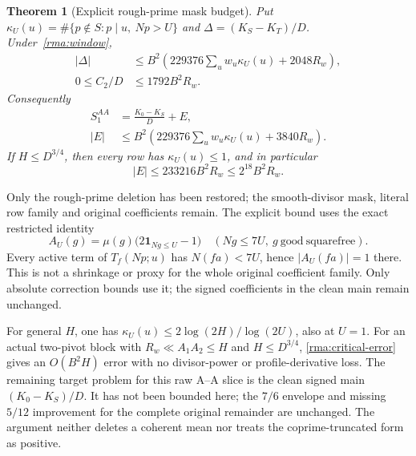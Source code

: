 \documentclass[11pt]{article}
\newtheorem{theorem}{Theorem}[section]
\theoremstyle{definition}\newtheorem{definition}[theorem]{Definition}
\theoremstyle{remark}\newtheorem{remark}[theorem]{Remark}
\begin{document}
\begin{theorem}[Explicit rough-prime mask budget]\label{rma:mask}
Put $\kappa_U(u)=\#\{p\notin S:p\mid u,\ Np>U\}$ and
$\Delta=(K_S-K_T)/D$. Under~\eqref{rma:window},
\begin{align}
 |\Delta|&\le B^2\left(229376\sum_u w_u\kappa_U(u)+2048R_w\right),
                    \label{rma:delta}\\
 0\le C_2/D&\le1792B^2R_w.\label{rma:Cbound}
\end{align}
Consequently
\begin{align}
 S_1^{AA}&=\frac{K_0-K_S}{D}+E,\label{rma:clean}\\
 |E|&\le B^2\left(229376\sum_u w_u\kappa_U(u)+3840R_w\right).
                    \label{rma:error}
\end{align}
If $H\le D^{3/4}$, then every row has $\kappa_U(u)\le1$, and in particular
\begin{equation}\label{rma:critical-error}
 |E|\le233216B^2R_w\le2^{18}B^2R_w.
\end{equation}
\end{theorem}
Only the rough-prime deletion has been restored; the smooth-divisor
mask, literal row family and original coefficients remain. The explicit
bound uses the exact restricted identity
\[
 A_U(g)=\mu(g)\bigl(2\mathbf1_{Ng\le U}-1\bigr)
 \quad(Ng\le7U,\ g\ \mathrm{good\ squarefree}).
\]
Every active term of $T_f(Np;u)$ has $N(fa)<7U$, hence
$|A_U(fa)|=1$ there. This is not a shrinkage or proxy for the whole
original coefficient family. Only absolute correction bounds use it;
the signed coefficients in the clean main remain unchanged.

For general $H$, one has
$\kappa_U(u)\le2\log(2H)/\log(2U)$, also at $U=1$.
For an actual two-pivot block with $R_w\ll A_1A_2\le H$ and
$H\le D^{3/4}$, \eqref{rma:critical-error} gives an $O(B^2H)$
error with no divisor-power or profile-derivative loss. The remaining
target problem for this raw A--A slice is the clean signed main
$(K_0-K_S)/D$. It has not been bounded here; the $7/6$ envelope and
missing $5/12$ improvement for the complete original remainder are
unchanged. The argument neither deletes a coherent mean nor treats the
coprime-truncated form as positive.
\end{document}
